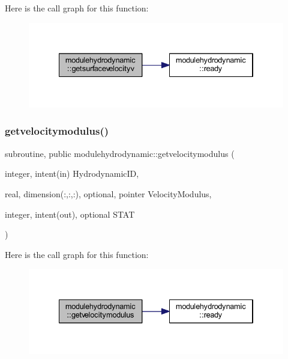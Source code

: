 Here is the call graph for this function\+:\nopagebreak
\begin{figure}[H]
\begin{center}
\leavevmode
\includegraphics[width=334pt]{namespacemodulehydrodynamic_a7b33d38f90e3b125d5fe454fd30c25b9_cgraph}
\end{center}
\end{figure}
\mbox{\label{namespacemodulehydrodynamic_a898445cf253d8a76844408350387b376}} 
\subsubsection{\texorpdfstring{getvelocitymodulus()}{getvelocitymodulus()}}
{\footnotesize\ttfamily subroutine, public modulehydrodynamic\+::getvelocitymodulus (\begin{DoxyParamCaption}\item[{integer, intent(in)}]{Hydrodynamic\+ID,  }\item[{real, dimension(\+:,\+:,\+:), optional, pointer}]{Velocity\+Modulus,  }\item[{integer, intent(out), optional}]{S\+T\+AT }\end{DoxyParamCaption})}

Here is the call graph for this function\+:\nopagebreak
\begin{figure}[H]
\begin{center}
\leavevmode
\includegraphics[width=334pt]{namespacemodulehydrodynamic_a898445cf253d8a76844408350387b376_cgraph}
\end{center}
\end{figure}
\mbox{\label{namespacemodulehydrodynamic_a384df1b51bd6ad1c528b5658c4414bae}} 
